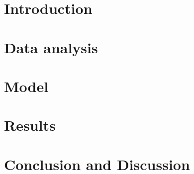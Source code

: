 \documentclass[11pt,titlepage,a4paper]{article}
\begin{document}
    

    \tableofcontents

    \newpage
    
    \section{Introduction}\label{section_introduction}
    
    \newpage
    
    \section{Data analysis}\label{section_data_analysis}
    
    \newpage
    
    \section{Model}\label{section_model}
    
    \newpage
    
    \section{Results}\label{section_results}
    
    \newpage
    
    \section{Conclusion and Discussion}\label{section_discussion}
    
    \newpage
    
    \printbibliography
    \newpage
    
    \appendix
    
\end{document}
